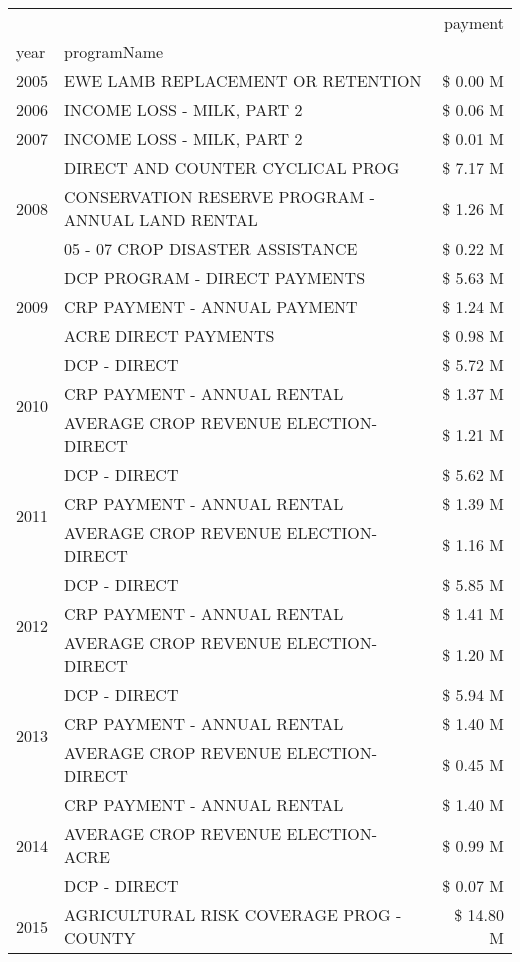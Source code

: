 \begin{tabular}{llr}
\toprule
 &  & payment \\
year & programName &  \\
\midrule
2005 & EWE LAMB REPLACEMENT OR RETENTION & \$ 0.00 M \\
\cline{1-3}
2006 & INCOME LOSS - MILK, PART 2 & \$ 0.06 M \\
\cline{1-3}
2007 & INCOME LOSS - MILK, PART 2 & \$ 0.01 M \\
\cline{1-3}
\multirow[t]{3}{*}{2008} & DIRECT AND COUNTER CYCLICAL PROG & \$ 7.17 M \\
 & CONSERVATION RESERVE PROGRAM - ANNUAL LAND RENTAL & \$ 1.26 M \\
 & 05 - 07 CROP DISASTER ASSISTANCE & \$ 0.22 M \\
\cline{1-3}
\multirow[t]{3}{*}{2009} & DCP PROGRAM - DIRECT PAYMENTS & \$ 5.63 M \\
 & CRP PAYMENT - ANNUAL PAYMENT & \$ 1.24 M \\
 & ACRE DIRECT PAYMENTS & \$ 0.98 M \\
\cline{1-3}
\multirow[t]{3}{*}{2010} & DCP - DIRECT & \$ 5.72 M \\
 & CRP PAYMENT - ANNUAL RENTAL & \$ 1.37 M \\
 & AVERAGE CROP REVENUE ELECTION-DIRECT & \$ 1.21 M \\
\cline{1-3}
\multirow[t]{3}{*}{2011} & DCP - DIRECT & \$ 5.62 M \\
 & CRP PAYMENT - ANNUAL RENTAL & \$ 1.39 M \\
 & AVERAGE CROP REVENUE ELECTION-DIRECT & \$ 1.16 M \\
\cline{1-3}
\multirow[t]{3}{*}{2012} & DCP - DIRECT & \$ 5.85 M \\
 & CRP PAYMENT - ANNUAL RENTAL & \$ 1.41 M \\
 & AVERAGE CROP REVENUE ELECTION-DIRECT & \$ 1.20 M \\
\cline{1-3}
\multirow[t]{3}{*}{2013} & DCP - DIRECT & \$ 5.94 M \\
 & CRP PAYMENT - ANNUAL RENTAL & \$ 1.40 M \\
 & AVERAGE CROP REVENUE ELECTION-DIRECT & \$ 0.45 M \\
\cline{1-3}
\multirow[t]{3}{*}{2014} & CRP PAYMENT - ANNUAL RENTAL & \$ 1.40 M \\
 & AVERAGE CROP REVENUE ELECTION-ACRE & \$ 0.99 M \\
 & DCP - DIRECT & \$ 0.07 M \\
\cline{1-3}
\multirow[t]{3}{*}{2015} & AGRICULTURAL RISK COVERAGE PROG - COUNTY & \$ 14.80 M \\

\end{tabular}
